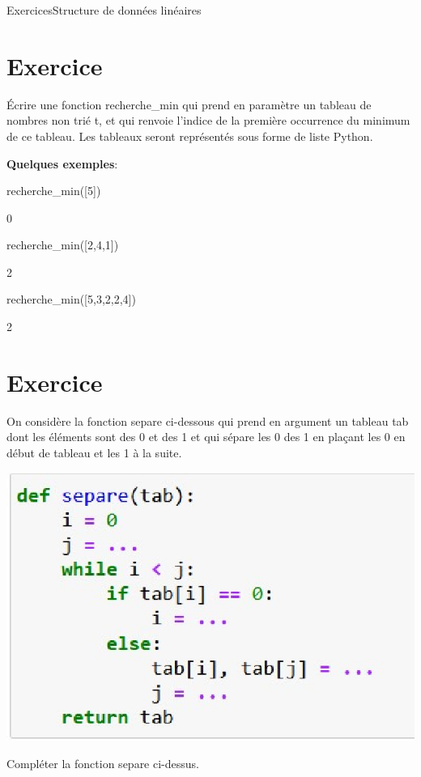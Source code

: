\documentclass[11pt,a4paper]{article}
\newcounter{num}
\begin{document}
\begin{NSI}
{Exercices}{Structure de données linéaires}
\end{NSI}


\section*{Exercice \thenum}

Écrire une fonction \textsf{recherche\_min} qui prend en paramètre un tableau de nombres non trié \textsf{t}, et qui renvoie l'indice de la première occurrence du minimum de ce tableau. Les tableaux seront représentés sous forme de liste Python.

\textbf{Quelques exemples}:

\textsf{recherche\_min([5])}

0

\textsf{recherche\_min([2,4,1])}

2

\textsf{recherche\_min([5,3,2,2,4])}

2


\section*{Exercice \thenum}

On considère la fonction \textsf{separe} ci-dessous qui prend en argument un tableau \textsf{tab} dont les éléments sont des 0 et des 1 et qui sépare les 0 des 1 en plaçant les 0 en début de tableau et les 1 à la suite.

\includegraphics[scale=0.8]{../img/fct_separe.eps}

Compléter la fonction \textsf{separe} ci-dessus.
\end{document}
